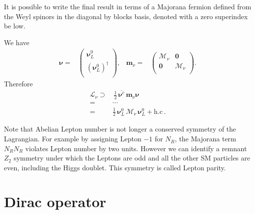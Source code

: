 It is possible to write the final result in terms of a Majorana fermion defined from the Weyl spinors in the diagonal by blocks basis, denoted with a zero superindex be
low.
\begin{frame}
We have
\begin{align}
  \boldsymbol{\nu}=&
  \begin{pmatrix}
    \boldsymbol{\nu}_L^0\\
    \left( \boldsymbol{\nu}_L^0 \right)^{\dagger}\\
  \end{pmatrix},&       \boldsymbol{m}_{\nu}=& \begin{pmatrix}
                                      \boldsymbol{\mathcal{M}}_{\nu} & \boldsymbol{0} \\
                                      \boldsymbol{0} & \boldsymbol{\mathcal{M}}_{\nu}  \\
                                    \end{pmatrix}.
\end{align}
Therefore
\begin{align}
  \mathcal{L}_{\nu}\supset &\, \tfrac{1}{2}\,\overline{\boldsymbol{\nu}^c}\, \boldsymbol{m}_{\nu} \boldsymbol{\nu}   \nonumber\\
=& \cdots \nonumber\\
=&\tfrac{1}{2}\,\boldsymbol{\nu}_L^{0}\, \boldsymbol{\mathcal{M}}_{\nu}\,   \boldsymbol{\nu}_L^{0} +\text{h.c}\,.
\end{align}
\end{frame}

Note that Abelian Lepton number is not longer a conserved symmetry of the Lagrangian. For example by assigning Lepton $-1$ for $N_R$, the Majorana term $N_R N_R$ violates Lepton number by two units. However we can identify a remnant $Z_{2}$ symmetry under which the Leptons are odd and all the other SM particles are even, including the Higgs doublet. This symmetry is called Lepton parity.


\section{Dirac operator}

